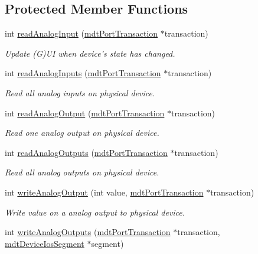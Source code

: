 \subsection*{Protected Member Functions}
\begin{DoxyCompactItemize}
\item 
int \hyperlink{classmdt_device_modbus_aa2a024793ae2a5e81c7e92260a70cd9e}{read\-Analog\-Input} (\hyperlink{classmdt_port_transaction}{mdt\-Port\-Transaction} $\ast$transaction)
\begin{DoxyCompactList}\small\item\em Update (G)U\-I when device's state has changed. \end{DoxyCompactList}\item 
int \hyperlink{classmdt_device_modbus_a846af6dbf80bbf747f3f966420ef6f92}{read\-Analog\-Inputs} (\hyperlink{classmdt_port_transaction}{mdt\-Port\-Transaction} $\ast$transaction)
\begin{DoxyCompactList}\small\item\em Read all analog inputs on physical device. \end{DoxyCompactList}\item 
int \hyperlink{classmdt_device_modbus_a30c815cbe5e603e8114dcbc09849e322}{read\-Analog\-Output} (\hyperlink{classmdt_port_transaction}{mdt\-Port\-Transaction} $\ast$transaction)
\begin{DoxyCompactList}\small\item\em Read one analog output on physical device. \end{DoxyCompactList}\item 
int \hyperlink{classmdt_device_modbus_ae02dd44f1d873fcc15ff75d781b62b0b}{read\-Analog\-Outputs} (\hyperlink{classmdt_port_transaction}{mdt\-Port\-Transaction} $\ast$transaction)
\begin{DoxyCompactList}\small\item\em Read all analog outputs on physical device. \end{DoxyCompactList}\item 
int \hyperlink{classmdt_device_modbus_ac63297a31205759622f341525c34251f}{write\-Analog\-Output} (int value, \hyperlink{classmdt_port_transaction}{mdt\-Port\-Transaction} $\ast$transaction)
\begin{DoxyCompactList}\small\item\em Write value on a analog output to physical device. \end{DoxyCompactList}\item 
int \hyperlink{classmdt_device_modbus_aa09d1682bef4bbc08b59b20110e613ff}{write\-Analog\-Outputs} (\hyperlink{classmdt_port_transaction}{mdt\-Port\-Transaction} $\ast$transaction, \hyperlink{classmdt_device_ios_segment}{mdt\-Device\-Ios\-Segment} $\ast$segment)

\end{DoxyCompactItemize}
